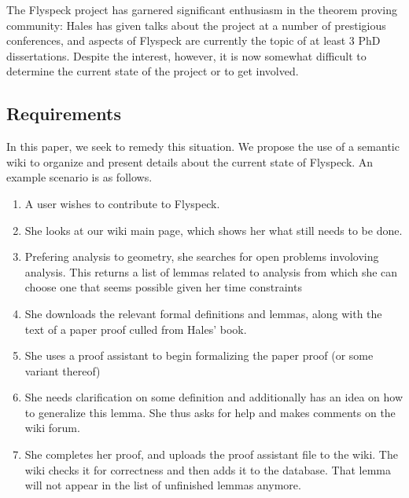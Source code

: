 The Flyspeck project has garnered significant enthusiasm in the theorem proving
community: Hales has given talks about the project at a number of
prestigious conferences, and aspects of Flyspeck are currently the topic of at least
3 PhD dissertations.  Despite the interest, however, it is now somewhat difficult to 
determine the current state of the project or to get involved.  



\subsection{Requirements}
In this paper, we seek to remedy this situation.  We propose the use of a 
semantic wiki to organize and present details about the current state of Flyspeck.
An example scenario is as follows.  

\begin{enumerate}  %
\item A user wishes to contribute to Flyspeck. %
\item She looks at our wiki main page, which shows her what still needs to be done. %
\item Prefering analysis to geometry, she searches for open problems involoving analysis.  %
  This returns a list of lemmas related to analysis from which she can choose one that %
  seems possible given her time constraints %
\item She downloads the relevant formal definitions and lemmas, along with the text %
  of a paper proof culled from Hales' book. %
\item She uses a proof assistant to begin formalizing the paper proof (or some variant thereof) %
\item She needs clarification on some definition and additionally has an idea on how to generalize this %
  lemma.  She thus asks for help and makes comments on the wiki forum.   %
\item She completes her proof, and uploads the proof assistant file to the wiki. %
  The wiki checks it for correctness and then adds it to the database.  That lemma will %
  not appear in the list of unfinished lemmas anymore. %
\end{enumerate}  %




